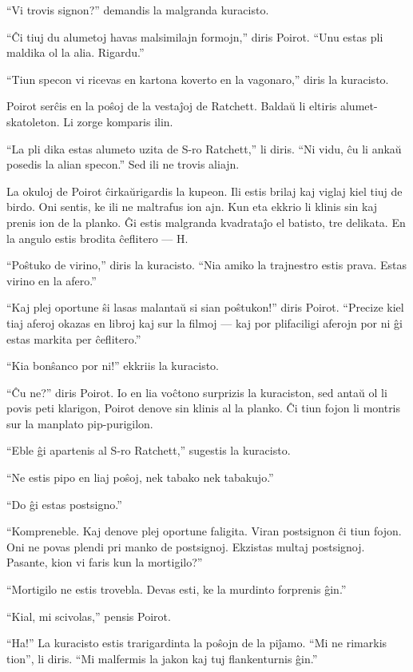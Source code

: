 ``Vi trovis signon?'' demandis la malgranda kuracisto.

``Ĉi tiuj du alumetoj havas malsimilajn formojn,'' diris Poirot. ``Unu estas pli maldika ol la alia. Rigardu.''

``Tiun specon vi ricevas en kartona koverto en la vagonaro,'' diris la kuracisto.

Poirot serĉis en la poŝoj de la vestaĵoj de Ratchett. Baldaŭ li eltiris alumet-skatoleton. Li zorge komparis ilin.

``La pli dika estas alumeto uzita de S-ro Ratchett,'' li diris. ``Ni vidu, ĉu li ankaŭ posedis la alian specon.'' Sed ili ne trovis aliajn.

La okuloj de Poirot ĉirkaŭrigardis la kupeon. Ili estis brilaj kaj viglaj kiel tiuj de birdo. Oni sentis, ke ili ne maltrafus ion ajn. Kun eta ekkrio li klinis sin kaj prenis ion de la planko. Ĝi estis malgranda kvadrataĵo el batisto, tre delikata. En la angulo estis brodita ĉeflitero --- H.

``Poŝtuko de virino,'' diris la kuracisto. ``Nia amiko la trajnestro estis prava. Estas virino en la afero.''

``Kaj plej oportune ŝi lasas malantaŭ si sian poŝtukon!'' diris Poirot. ``Precize kiel tiaj aferoj okazas en libroj kaj sur la filmoj --- kaj por plifaciligi aferojn por ni ĝi estas markita per ĉeflitero.''

``Kia bonŝanco por ni!'' ekkriis la kuracisto.

``Ĉu ne?'' diris Poirot. Io en lia voĉtono surprizis la kuraciston, sed antaŭ ol li povis peti klarigon, Poirot denove sin klinis al la planko. Ĉi tiun fojon li montris sur la manplato pip-purigilon.

``Eble ĝi apartenis al S-ro Ratchett,'' sugestis la kuracisto.

``Ne estis pipo en liaj poŝoj, nek tabako nek tabakujo.''

``Do ĝi estas postsigno.''

``Kompreneble. Kaj denove plej oportune faligita. Viran postsignon ĉi tiun fojon. Oni ne povas plendi pri manko de postsignoj. Ekzistas multaj postsignoj. Pasante, kion vi faris kun la mortigilo?''

``Mortigilo ne estis trovebla. Devas esti, ke la murdinto forprenis ĝin.''

``Kial, mi scivolas,'' pensis Poirot.

``Ha!'' La kuracisto estis trarigardinta la poŝojn de la piĵamo. ``Mi ne rimarkis tion'', li diris. ``Mi malfermis la jakon kaj tuj flankenturnis ĝin.''

